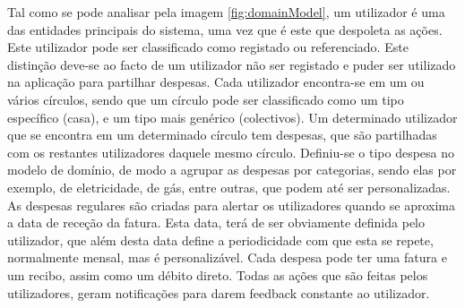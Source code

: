 Tal como se pode analisar pela imagem \ref{fig:domainModel}, um utilizador é uma das entidades principais do sistema, uma vez que é este que despoleta as ações. Este utilizador pode ser classificado como registado ou referenciado. Este distinção deve-se ao facto de um utilizador não ser registado e puder ser utilizado na aplicação para partilhar despesas.
Cada utilizador encontra-se em um ou vários círculos, sendo que um círculo pode ser classificado como um tipo específico (casa), e um tipo mais genérico (colectivos).
Um determinado utilizador que se encontra em um determinado círculo tem despesas, que são partilhadas com os restantes utilizadores daquele mesmo círculo.
Definiu-se o tipo despesa no modelo de domínio, de modo a agrupar as despesas por categorias, sendo elas por exemplo, de eletricidade, de gás, entre outras, que podem até ser personalizadas.
As despesas regulares são criadas para alertar os utilizadores quando se aproxima a data de receção da fatura. Esta data, terá de ser obviamente definida pelo utilizador, que além desta data define a periodicidade com que esta se repete, normalmente mensal, mas é personalizável.
Cada despesa pode ter uma fatura e um recibo, assim como um débito direto.
Todas as ações que são feitas pelos utilizadores, geram notificações para darem feedback constante ao utilizador.